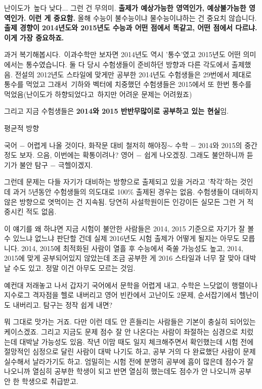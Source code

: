 난이도가 높다 낮다... 그런 건 무의미.
\textbf{출제가 예상가능한 영역인가, 예상불가능한 영역인가. 이런 게 중요함.}
올해 수능이 불수능이냐 물수능이냐하는 건 중요치 않습니다.
\textbf{출제 경향이 2014년도와 2015년도 수능과 어떤 점에서 똑같고, 어떤 점에서 다르냐. 이게 가장 중요하죠.}
\vspace{5mm}

과거 복기해봅시다. 이과수학만 보자면 2014년도 역시 '통수'였고 2015년도 어떤 의미에서는 통수였습니다.
둘 다 당시 수험생들이 준비하던 방향과 다른 각도에서 출제했음.
전설의 2012년도 스타일에 맞게만 공부한 2014년도 수험생들은 29번에서 제대로 통수를 먹었고
그래서 기하와 벡터에 치중했던 수험생들은 2015에서 또 한번 통수를 먹었음(난이도가 하향되었다고 하지만 어려운 문제는 어려웠죠)
\vspace{5mm}

그리고 지금 수험생들은 \textbf{2014와 2015 반반무많이로 공부하고 있는 현실}임.
\vspace{5mm}

평균적 방향
\vspace{5mm}

국어 $-$ 어렵게 나올 것이다, 화작문 대비 철저히 해야징$\sim$
수학 $-$ 2014와 2015의 중간정도 보자. 으음, 이번에는 확통이려나?
영어 $-$ 쉽게 나오겠징. 그래도 불안하니까 듣기가 불안
탐구 $-$ 극헬이겠지.
\vspace{5mm}

그런데 문제는 다들 자기가 대비하는 방향으로 출제되고 있을 거라고 '착각'하는 것인데
과거 5년동안 수험생들의 의도대로 100$\%$ 출제된 경우는 없음. 수험생들이 대비하지 않은 방향으로 엿먹이는 건 지속됨.
당연히 사설학원이든 인강이든 실모든 그런 거 적중시킨 적도 없음.
\vspace{5mm}

이 얘기를 왜 하냐면 지금 시험이 불안한 사람들은 2014, 2015 기준으로 자기가 잘 볼 수 있느냐 없느냐 판단할 건데
실제 2016년도 시험 출제가 어떻게 될지는 아무도 모릅니다.
2014, 2015에 최적화된 사람이 열흘 후 수능에서 죽쑬 가능성도 높고,
2014, 2015에 맞게 공부되어있지 않았는데 조금 공부한 게 2016 스타일과 너무 잘 맞아 대박날 수도 있고.
정말 이건 아무도 모르는 것임.
\vspace{5mm}

예컨대 저래놓고 나서
갑자기 국어에서 문학을 어렵게 내고,
수학은 느닷없이 행렬이나 지수로그 격자점을 헬로 내버리고
영어 빈칸에서 고난이도 2문제, 순서잡기에서 헬난이도 내버리고. 탐구는 정작 쉽게 내면?
\vspace{5mm}

뭐 그대로 맛가는 거죠. 다만 이런 데도 안 흔들리는 사람들은 기본이 충실히 되어있는 케이스겠죠.
그리고 지금도 문제 점수 잘 안 나온다는 사람이 좌절하는 심경으로 치렀는데 대박날 가능성도 있음.
작년 이맘 때도 일지 체크해주면서 확인했는데 시험 전에 절망적인 심정으로 달린 사람이 대박 나기도 하고,
공부 거의 다 완료했단 사람이 문제 실수해서 날라가기도 하고.
엄밀히는 시험 전에 분명히 공부에 흠이 많은데 점수가 잘 나오니까 열심히 공부한 학생이 되고
반면 열심히 했는데도 점수가 안 나오니까 공부 안 한 학생으로 취급받고.
\vspace{5mm}

